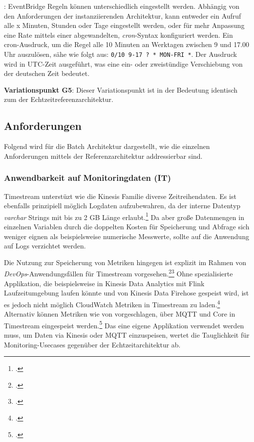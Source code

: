 : EventBridge Regeln können unterschiedlich eingestellt werden. Abhängig von den Anforderungen der instanziierenden Architektur, kann entweder ein Aufruf alle x Minuten, Stunden oder Tage eingestellt werden, oder für mehr Anpassung eine Rate mittels einer abgewandelten, \textit{cron}-Syntax konfiguriert werden. Ein cron-Ausdruck, um die Regel alle 10 Minuten an Werktagen zwischen 9 und 17.00 Uhr auszulösen, sähe wie folgt aus: \texttt{0/10 9-17 ? * MON-FRI *}. Der Ausdruck wird in \ac{UTC}-Zeit ausgeführt, was eine ein- oder zweistündige Verschiebung von der deutschen Zeit bedeutet.

\textbf{Variationspunkt G5}: Dieser Variationspunkt ist in der Bedeutung identisch zum  der Echtzeitreferenzarchitektur.


\subsection{Anforderungen}
Folgend wird für die Batch Architektur dargestellt, wie die einzelnen Anforderungen mittels der Referenzarchitektur addressierbar sind.
\subsubsection{Anwendbarkeit auf Monitoringdaten (IT)}
Timestream unterstüzt wie die Kinesis Familie diverse Zeitreihendaten. Es ist ebenfalls prinzipiell möglich Logdaten aufzubewahren, da der interne Datentyp \textit{varchar} Strings mit bis zu 2 GB Länge erlaubt.\footcite[Vgl.][]{AmazonWebServicesInc..o.J.br} Da aber große Datenmengen in einzelnen Variablen durch die doppelten Kosten für Speicherung und Abfrage sich weniger eignen als beispielsweise numerische Messwerte, sollte auf die Anwendung auf Logs verzichtet werden.

Die Nutzung zur Speicherung von Metriken hingegen ist explizit im Rahmen von \textit{DevOps}-Anwendungsfällen für Timestream vorgesehen.\footcite[Vgl.][]{AmazonWebServicesInc..o.J.ak}\nzitat\footcite[Vgl.][]{Das.2020} Ohne spezialisierte Applikation, die beispielsweise in Kinesis Data Analytics mit Flink Laufzeitumgebung laufen könnte und von Kinesis Data Firehose gespeist wird, ist es jedoch nicht möglich CloudWatch Metriken in Timestream zu laden.\footcite[Vgl.][]{Riddle.2021} Alternativ können Metriken wie von \citeauthor{Pochiraju.2020} vorgeschlagen, über \ac{MQTT} und \AWSIOT{} Core in Timestream eingespeist werden.\footcite[Vgl.][]{Pochiraju.2020} Das eine eigene Applikation verwendet werden muss, um Daten via Kinesis oder \ac{MQTT} einzuspeisen, wertet die Tauglichkeit für Monitoring-Usecases gegenüber der Echtzeitarchitektur ab.


